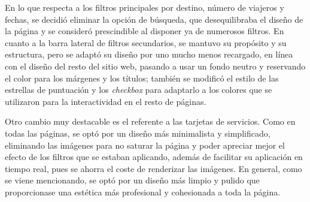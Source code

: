 \documentclass[11pt, a4paper]{book}
\begin{document}
    En lo que respecta a los filtros principales por destino, número de viajeros y fechas, se decidió eliminar la opción de búsqueda, que desequilibraba el diseño de la página y se consideró prescindible al disponer ya de numerosos filtros. En cuanto a la barra lateral de filtros secundarios, se mantuvo su propósito y su estructura, pero se adaptó su diseño por uno mucho menos recargado, en línea con el diseño del resto del sitio web, pasando a usar un fondo neutro y reservando el color para los márgenes y los títulos; también se modificó el estilo de las estrellas de puntuación y los \textit{checkbox} para adaptarlo a los colores que se utilizaron para la interactividad en el resto de páginas. 

    Otro cambio muy destacable es el referente a las tarjetas de servicios. Como en todas las páginas, se optó por un diseño más minimalista y simplificado, eliminando las imágenes para no saturar la página y poder apreciar mejor el efecto de los filtros que se estaban aplicando, además de facilitar su aplicación en tiempo real, pues se ahorra el coste de renderizar las imágenes. En general, como se viene mencionando, se optó por un diseño más limpio y pulido que proporcionase una estética más profesional y cohesionada a toda la página.
\end{document}
